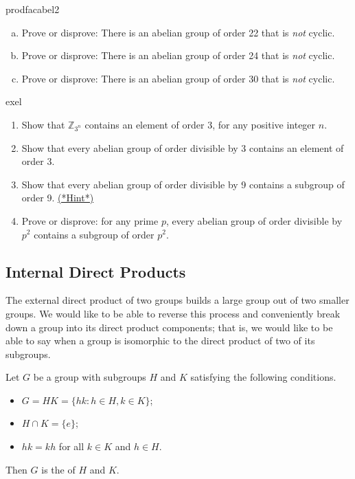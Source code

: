 \begin{exercise}{prodfacabel2}
\begin{enumerate}[(a)] 
\item
Prove or disprove: There is an abelian group of order 22 that is \emph{not} cyclic. 
\item
Prove or disprove: There is an abelian group of order 24 that is \emph{not} cyclic. 
\item
Prove or disprove: There is an abelian group of order 30 that is \emph{not} cyclic. 
\end{enumerate}
\end{exercise}

\begin{exercise}{exel}
\begin{enumerate}
\item
Show that $\mathbb{Z}_{3^n}$ contains an element of order 3, for any positive integer $n$.
\item
Show that every abelian group of order divisible by 3 contains an element of order 3.  
\item
Show that every abelian group of order divisible by 9 contains a subgroup of order 9. 
\hyperref[sec:isomorph:hints]{(*Hint*)}
\item
Prove or disprove: for any prime $p$, every abelian group of order divisible by $p^2$  contains a subgroup of order $p^2$. 
\end{enumerate}
\end{exercise}
 
\subsection{Internal Direct Products}
 

The external direct product of two groups builds a large group out of
two smaller groups.   We would like to be able to reverse this process
and conveniently break down a group into its direct product
components; that is, we would like to be able to say when a group is
isomorphic to the direct product of two of its subgroups.
 
\begin{defn}
Let $G$ be a group with subgroups $H$ and $K$ satisfying the following
conditions.
\begin{itemize}
 
\item
$G = HK = \{ hk : h \in H, k \in K  \}$;
 
\item
$H \cap K = \{ e \}$;
 
\item
$hk = kh$ for all $k \in K$ and $h \in H$.
 
\end{itemize}
Then $G$ is the  of $H$ and $K$.
\end{defn}
 
